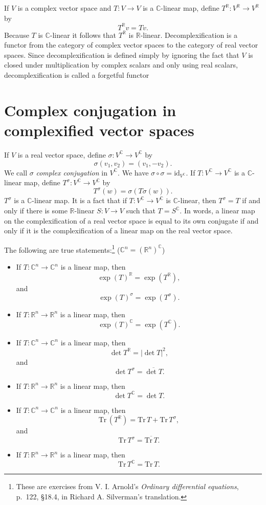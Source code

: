 \documentclass{article}
\newcommand{\Tr}{\textrm{Tr}\,}
\newcommand{\id}{\textrm{id}}
\begin{document}
If $V$ is a complex vector space and $T:V \to V$ is a $\mathbb{C}$-linear map, define $T^\mathbb{R}:V^\mathbb{R} \to V^\mathbb{R}$ by
\[
T^\mathbb{R}v=Tv.
\]
Because $T$ is $\mathbb{C}$-linear it follows that $T^\mathbb{R}$ is $\mathbb{R}$-linear.
Decomplexification is a functor from the category of complex vector spaces to the category of real vector spaces. Since 
decomplexification is defined simply by ignoring the fact that $V$ is closed
under multiplication by complex scalars and only using real scalars,
decomplexification is called a forgetful functor

\section{Complex conjugation in complexified vector spaces}
If $V$ is a real vector space, define $\sigma:V^\mathbb{C} \to V^\mathbb{C}$ by
\[
\sigma(v_1,v_2)=(v_1,-v_2).
\]
We call $\sigma$ {\em complex conjugation} in $V^\mathbb{C}$. We have $\sigma \circ \sigma = \id_{V^\mathbb{C}}$.
If $T:V^\mathbb{C} \to V^\mathbb{C}$ is a $\mathbb{C}$-linear map, define $T^\sigma:V^\mathbb{C} \to V^\mathbb{C}$
by
\[
T^\sigma(w)=\sigma(T \sigma (w)).
\]
$T^\sigma$ is a $\mathbb{C}$-linear map.
It is a fact that if $T:V^\mathbb{C} \to V^\mathbb{C}$ is $\mathbb{C}$-linear, then $T^\sigma=T$ if and only if there
is some $\mathbb{R}$-linear $S:V \to V$ such that $T=S^\mathbb{C}$. In words, a linear map on the complexification
of a real vector space is equal to its own conjugate if and only if it is the complexification of a linear map
on the real vector space.

The following are true statements:\footnote{These are exercises from V. I. Arnold's {\em Ordinary differential equations},
p.~122, \S 18.4, in Richard A. Silverman's translation.} ($\mathbb{C}^n=(\mathbb{R}^n)^\mathbb{C}$)

\begin{itemize}
\item If $T:\mathbb{C}^n \to \mathbb{C}^n$ is a linear map, then
\[
\exp(T)^\mathbb{R}=\exp(T^\mathbb{R}),
\]
and 
\[
\exp(T)^\sigma=\exp(T^\sigma).
\]
\item If $T:\mathbb{R}^n \to \mathbb{R}^n$ is a linear map, then
\[
\exp(T)^\mathbb{C}=\exp(T^\mathbb{C}).
\]
\item If $T:\mathbb{C}^n \to \mathbb{C}^n$ is a linear map, then
\[
\det T^\mathbb{R}=|\det T|^2,
\]
and 
\[
\det T^\sigma=\overline{\det T}.
\]
\item If $T:\mathbb{R}^n \to \mathbb{R}^n$ is a linear map, then
\[
\det T^\mathbb{C}=\det T.
\]
\item If $T:\mathbb{C}^n \to \mathbb{C}^n$ is a linear map, then
\[
\Tr (T^\mathbb{R})=\Tr T+\Tr T^\sigma,
\]
and 
\[
\Tr T^\sigma=\overline{\Tr T}.
\]
\item If $T:\mathbb{R}^n \to \mathbb{R}^n$ is a linear map, then
\[
\Tr T^\mathbb{C}=\Tr T.
\]
\end{itemize}
\end{document}
